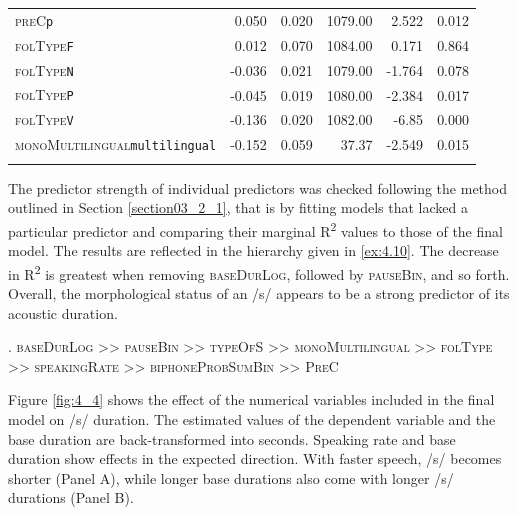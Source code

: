 \begin{table}
\begin{tabular}{lrrrrr}
\textsc{preC}\texttt{p}                        & 0.050    & 0.020 & 1079.00 & 2.522            & 0.012                      \\
\textsc{folType}\texttt{F}                     & 0.012    & 0.070 & 1084.00 & 0.171            & 0.864                      \\
\textsc{folType}\texttt{N}                     & -0.036   & 0.021 & 1079.00 & -1.764           & 0.078                      \\
\textsc{folType}\texttt{P}                     & -0.045   & 0.019 & 1080.00 & -2.384           & 0.017                      \\
\textsc{folType}\texttt{V}                     & -0.136   & 0.020 & 1082.00 & -6.85            & 0.000                      \\
\textsc{monoMultilingual}\texttt{multilingual} & -0.152   & 0.059 & 37.37   & -2.549           & 0.015                      \\
\lspbottomrule
\end{tabular}
\end{table}

The predictor strength of individual predictors was checked following the method outlined in Section \ref{section03_2_1}, that is by fitting models that lacked a particular predictor and comparing their marginal R\textsuperscript{2} values to those of the final model. The results are reflected in the hierarchy given in \ref{ex:4.10}. The decrease in R\textsuperscript{2} is greatest when removing \textsc{baseDurLog}, followed by \textsc{pauseBin}, and so forth. Overall, the morphological status of an /s/ appears to be a strong predictor of its acoustic duration.

\ex.
\label{ex:4.10}
\textsc{baseDurLog >> pauseBin >> typeOfS >> monoMultilingual >> folType >> speakingRate >> biphoneProbSumBin >> PreC}

Figure \ref{fig:4_4} shows the effect of the numerical variables included in the final model on /s/ duration. The estimated values of the dependent variable and the base duration are back-transformed into seconds. Speaking rate and base duration show effects in the expected direction. With faster speech, /s/ becomes shorter (Panel A), while longer base durations also come with longer /s/ durations (Panel B). 

